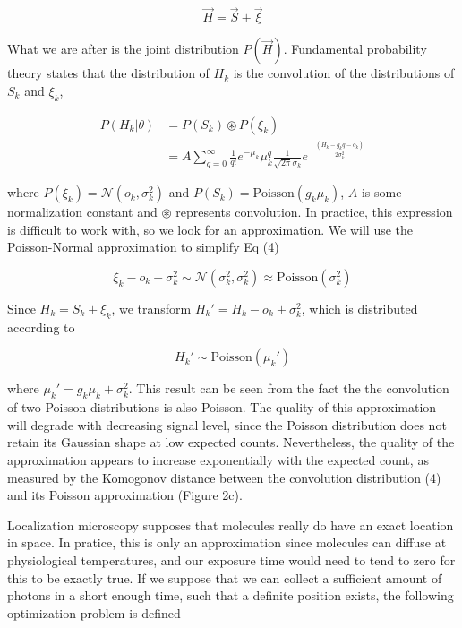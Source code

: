 \documentclass{ucetd}
\begin{document}
\begin{equation}
\vec{H} = \vec{S} + \vec{\xi}
\end{equation}

What we are after is the joint distribution $P(\vec{H})$. Fundamental probability theory states that the distribution of $H_{k}$ is the convolution of the distributions of $S_{k}$ and $\xi_{k}$,

\begin{align}
P(H_{k}|\theta) &= P(S_{k})\circledast P(\xi_{k})\\
&= A\sum_{q=0}^{\infty} \frac{1}{q!}e^{-\mu_{k}}\mu_{k}^{q}\frac{1}{\sqrt{2\pi}\sigma_{k}}e^{-\frac{(H_{k}-g_{k}q-o_{k})}{2\sigma_{k}^{2}}}
\end{align}

where $P(\xi_{k}) = \mathcal{N}(o_{k},\sigma_{k}^{2})$ and $P(S_{k}) = \mathrm{Poisson}(g_{k}\mu_{k})$,  $A$ is some normalization constant and $\circledast$ represents convolution. In practice, this expression is difficult to work with, so we look for an approximation. We will use the Poisson-Normal approximation to simplify Eq (4)

\begin{equation*}
\xi_{k} - o_{k} + \sigma_{k}^{2} \sim \mathcal{N}(\sigma_{k}^{2},\sigma_{k}^{2}) \approx \mathrm{Poisson}(\sigma_{k}^{2})
\end{equation*}

Since $H_{k} = S_{k} + \xi_{k}$, we transform $H_{k}' = H_{k} - o_{k} + \sigma_{k}^{2}$, which is distributed according to 

\begin{equation*}
H_{k}' \sim \mathrm{Poisson}(\mu_{k}')
\end{equation*}

where $\mu_{k}' = g_{k}\mu_{k} + \sigma_{k}^{2}$. This result can be seen from the fact the the convolution of two Poisson distributions is also Poisson. The quality of this approximation will degrade with decreasing signal level, since the Poisson distribution does not retain its Gaussian shape at low expected counts. Nevertheless, the quality of the approximation appears to increase exponentially with the expected count, as measured by the Komogonov distance between the convolution distribution (4) and its Poisson approximation (Figure 2c).

Localization microscopy supposes that molecules really do have an exact location in space. In pratice, this is only an approximation since molecules can diffuse at physiological temperatures, and our exposure time would need to tend to zero for this to be exactly true. If we suppose that we can collect a sufficient amount of photons in a short enough time, such that a definite position exists, the following optimization problem is defined
\end{document}
